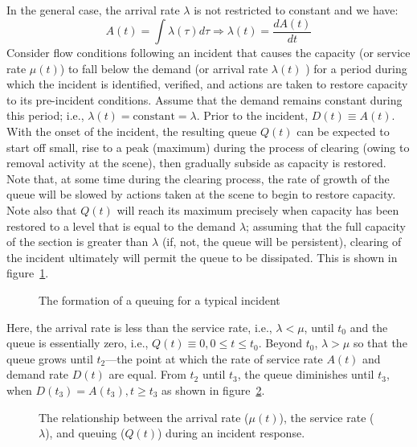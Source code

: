 \documentclass[12pt]{report}
\newcommand{\inputTikZ}[1]{%
    \begin{singlespace}
    \end{singlespace}
  }
\newcommand{\inputTikZ}[1]{%
    \begin{singlespace}
    \beginpgfgraphicnamed{#1-external}%
    \endpgfgraphicnamed%
    \end{singlespace}
  }
\newcounter{time}
\newcounter{space}
\begin{document}
In the general case, the arrival rate $\lambda$ is not restricted to constant and we have:
\begin{equation*}
  \label{eq:gen-arr}
  A(t) = \int\lambda(\tau)d\tau \Rightarrow \lambda(t) = \frac{dA(t)}{dt} 
\end{equation*}
Consider flow conditions following an incident that causes the
capacity (or service rate $\mu(t)$) to fall below the demand (or
arrival rate $\lambda(t)$ ) for a period during which the incident is
identified, verified, and actions are taken to restore capacity to its
pre-incident conditions.  Assume that the demand remains constant
during this period; i.e., $\lambda(t) = \mathrm{constant} = \lambda$.
Prior to the incident, $D(t) \equiv A(t)$.  With the onset of the
incident, the resulting queue $Q(t)$ can be expected to start off
small, rise to a peak (maximum) during the process of clearing (owing
to removal activity at the scene), then gradually subside as capacity
is restored. Note that, at some time during the clearing process, the
rate of growth of the queue will be slowed by actions taken at the
scene to begin to restore capacity. Note also that $Q(t)$ will reach
its maximum precisely when capacity has been restored to a level that
is equal to the demand $\lambda$; assuming that the full capacity of
the section is greater than $\lambda$ (if, not, the queue will be
persistent), clearing of the incident ultimately will permit the queue
to be dissipated. This is shown in
figure~\ref{fig:general-incident-queuing}.
\begin{figure}[tbp]
  \begin{center}
    \inputTikZ{figs/queuing-formation-for-typical-incident}
    \caption{The formation of a queuing for a typical incident}
    \label{fig:general-incident-queuing} 
  \end{center}
\end{figure}

Here, the arrival rate is less than the service rate, i.e., $\lambda <
\mu$, until $t_0$ and the queue is essentially zero, i.e., $Q(t)
\equiv 0, 0 \le t \le t_0$. Beyond $t_0$, $\lambda > \mu$ so that the
queue grows until $t_2$---the point at which the rate of service rate
$A(t)$ and demand rate $D(t)$ are equal.  From $t_2$ until $t_3$, the
queue diminishes until $t_3$, when $D(t_3) = A(t_3), t \ge t_3$ as
shown in figure~\ref{fig:arrival-service-and-queuing}.
\begin{figure}[tbp]
  \begin{center}
    \inputTikZ{figs/arrival-service-and-queuing}
    \caption[The relationship between the arrival rate, the service
    rate, and queuing during an incident response]{The relationship
      between the arrival rate ($\mu(t)$), the service rate
      ($\lambda$), and queuing ($Q(t)$) during an incident response.}
    \label{fig:arrival-service-and-queuing}
  \end{center}
\end{figure}
\end{document}
